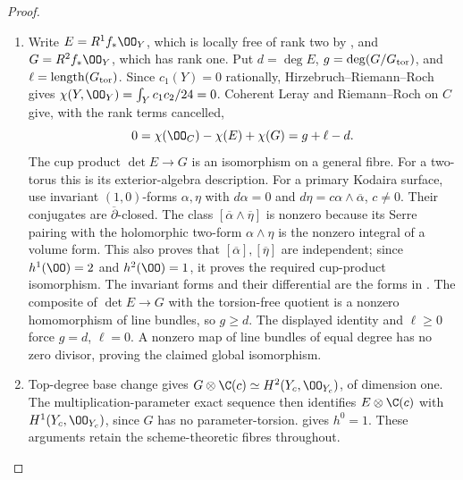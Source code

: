 \begin{proof}

\begin{enumerate}[label={$\langle1\rangle$\arabic*.},leftmargin=*]
\item Write $E=R^1f_*\OO_Y$, which is locally free of rank two by \cite[Theorem~2.2, pp.~4--5]{Viaclovsky2026Combs},
and $G=R^2f_*\OO_Y$, which has rank one. Put
$d=\deg E$, $g=\deg(G/G_{\rm tor})$, and
$\ell=\operatorname{length}(G_{\rm tor})$.
Since $c_1(Y)=0$ rationally, Hirzebruch--Riemann--Roch gives
$\chi(Y,\OO_Y)=\int_Yc_1c_2/24=0$.
Coherent Leray and Riemann--Roch on $C$ give, with the rank terms
cancelled,
\[
0=\chi(\OO_C)-\chi(E)+\chi(G)=g+\ell-d.
\]
The cup product $\det E\to G$ is an isomorphism on a general
fibre. For a two-torus this is its exterior-algebra description.
For a primary Kodaira surface, use invariant $(1,0)$-forms
$\alpha,\eta$ with $d\alpha=0$ and
$d\eta=c\alpha\wedge\overline\alpha$, $c\ne0$.
Their conjugates are $\overline\partial$-closed. The class
$[\overline\alpha\wedge\overline\eta]$ is nonzero because its
Serre pairing with the holomorphic two-form $\alpha\wedge\eta$
is the nonzero integral of a volume form. This also proves that
$[\overline\alpha],[\overline\eta]$ are independent; since
$h^1(\OO)=2$ and $h^2(\OO)=1$, it proves the required cup-product
isomorphism. The invariant forms and their differential are
the forms in \cite[\S3, equations (9)--(12)]{Borcea1984}.
The composite of $\det E\to G$ with the torsion-free quotient is a
nonzero homomorphism of line bundles, so $g\geq d$. The displayed
identity and $\ell\geq0$ force $g=d$, $\ell=0$. A nonzero map
of line bundles of equal degree has no zero divisor, proving the
claimed global isomorphism.

\item Top-degree base change gives
$G\otimes\C(c)\simeq H^2(Y_c,\OO_{Y_c})$, of dimension one.
The multiplication-parameter exact sequence then identifies
$E\otimes\C(c)$ with $H^1(Y_c,\OO_{Y_c})$, since $G$ has no
parameter-torsion. \cite[Theorem~2.2, pp.~4--5]{Viaclovsky2026Combs} gives $h^0=1$. These arguments retain the
scheme-theoretic fibres throughout.

\end{enumerate}
\end{proof}